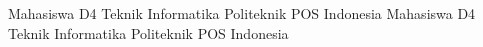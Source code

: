  Mahasiswa D4 Teknik Informatika Politeknik POS Indonesia
 Mahasiswa D4 Teknik Informatika Politeknik POS Indonesia


